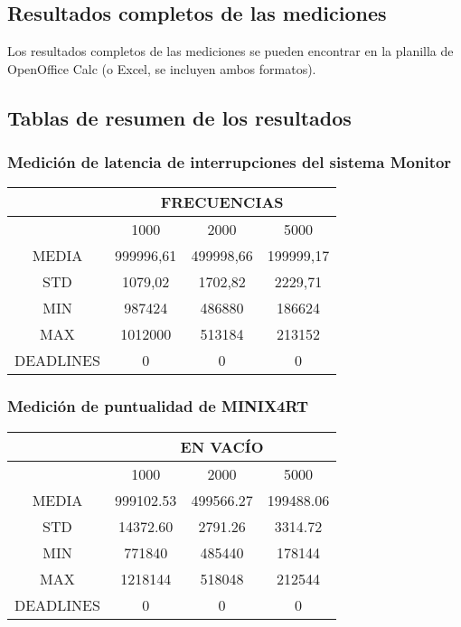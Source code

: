 \subsection{Resultados completos de las mediciones}
Los resultados completos de las mediciones se pueden encontrar en la planilla
de OpenOffice Calc (o Excel, se incluyen ambos formatos).


\subsection{Tablas de resumen de los resultados}

\subsubsection{Medición de latencia de interrupciones del sistema Monitor}
\begin{center}
\begin{tabular}{|c|c|c|c|}
\hline
&\multicolumn{3}{|c|}{FRECUENCIAS}\\
\hline
&1000&2000&5000\\
\hline
MEDIA&999996,61&499998,66&199999,17\\
\hline
STD&1079,02&1702,82&2229,71\\
\hline
MIN&987424&486880&186624\\
\hline
MAX&1012000&513184&213152\\
\hline
DEADLINES&0&0&0\\
\hline
\end{tabular}
\end{center}


\subsubsection{Medición de puntualidad de MINIX4RT}

\begin{center}
\begin{tabular}{|c|c|c|c|}
\hline
&\multicolumn{3}{|c|}{EN VACÍO}\\
\hline
&1000&2000&5000\\
\hline
MEDIA&999102.53&499566.27&199488.06\\
\hline
STD&14372.60&2791.26&3314.72\\
\hline
MIN&771840&485440&178144\\
\hline
MAX&1218144&518048&212544\\
\hline
DEADLINES&0&0&0\\
\hline
\end{tabular}
\end{center}

